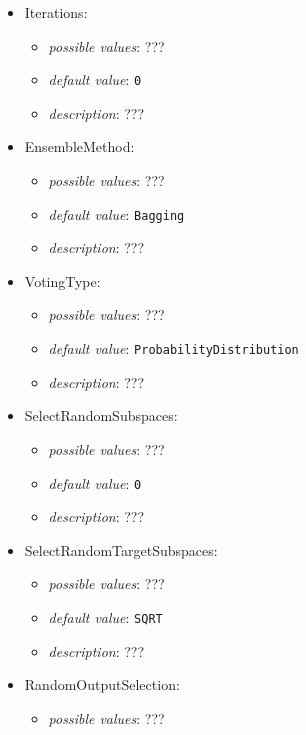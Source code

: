 \documentclass{article}
\begin{document}
\begin{itemize}
    \item Iterations:
           \begin{itemize}
                \item \emph{possible values}: ???
                \item \emph{default value}: \texttt{0}
                \item \emph{description}: ???
           \end{itemize}
    \item EnsembleMethod:
           \begin{itemize}
                \item \emph{possible values}: ???
                \item \emph{default value}: \texttt{Bagging}
                \item \emph{description}: ???
           \end{itemize}
    \item VotingType:
           \begin{itemize}
                \item \emph{possible values}: ???
                \item \emph{default value}: \texttt{ProbabilityDistribution}
                \item \emph{description}: ???
           \end{itemize}
    \item SelectRandomSubspaces:
           \begin{itemize}
                \item \emph{possible values}: ???
                \item \emph{default value}: \texttt{0}
                \item \emph{description}: ???
           \end{itemize}
    \item SelectRandomTargetSubspaces:
           \begin{itemize}
                \item \emph{possible values}: ???
                \item \emph{default value}: \texttt{SQRT}
                \item \emph{description}: ???
           \end{itemize}
    \item RandomOutputSelection:
           \begin{itemize}
                \item \emph{possible values}: ???

\end{itemize}
\end{itemize}
\end{document}
